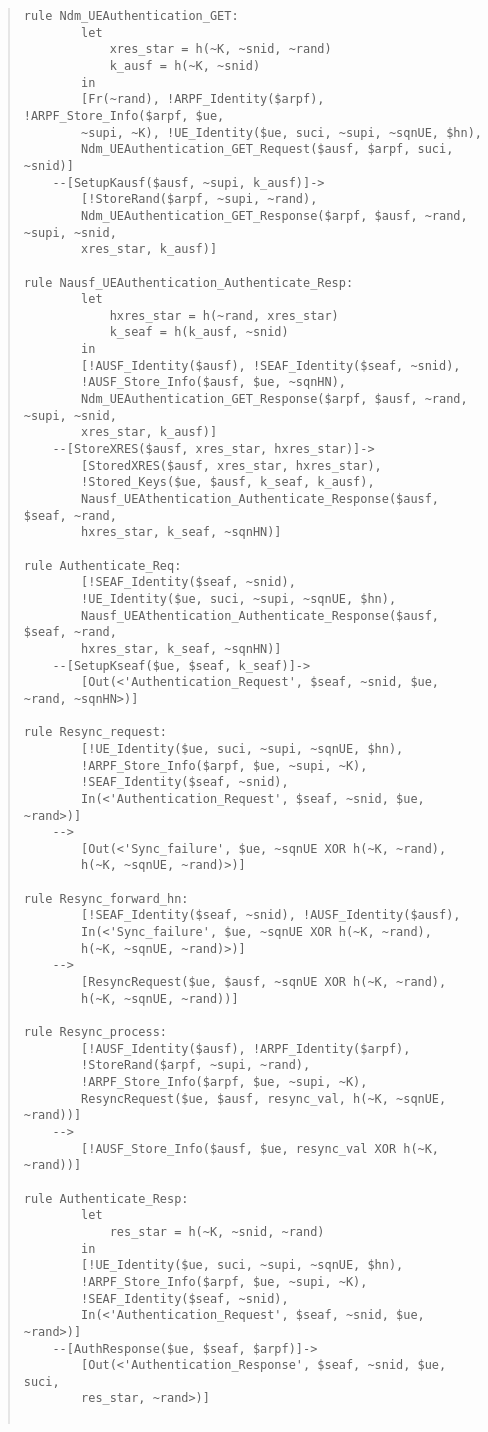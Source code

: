 \documentclass[10pt, pdftex]{article}
\begin{document}
\begin{quote}
\begin{verbatim}
rule Ndm_UEAuthentication_GET:
		let
			xres_star = h(~K, ~snid, ~rand)
			k_ausf = h(~K, ~snid)
		in
        [Fr(~rand), !ARPF_Identity($arpf), !ARPF_Store_Info($arpf, $ue,
        ~supi, ~K), !UE_Identity($ue, suci, ~supi, ~sqnUE, $hn),
        Ndm_UEAuthentication_GET_Request($ausf, $arpf, suci, ~snid)]
    --[SetupKausf($ausf, ~supi, k_ausf)]->
    	[!StoreRand($arpf, ~supi, ~rand),
    	Ndm_UEAuthentication_GET_Response($arpf, $ausf, ~rand, ~supi, ~snid,
    	xres_star, k_ausf)]

rule Nausf_UEAuthentication_Authenticate_Resp:
		let
			hxres_star = h(~rand, xres_star)
			k_seaf = h(k_ausf, ~snid)
		in
		[!AUSF_Identity($ausf), !SEAF_Identity($seaf, ~snid),
		!AUSF_Store_Info($ausf, $ue, ~sqnHN),
		Ndm_UEAuthentication_GET_Response($arpf, $ausf, ~rand, ~supi, ~snid,
		xres_star, k_ausf)]
	--[StoreXRES($ausf, xres_star, hxres_star)]->
		[StoredXRES($ausf, xres_star, hxres_star),
		!Stored_Keys($ue, $ausf, k_seaf, k_ausf),
		Nausf_UEAthentication_Authenticate_Response($ausf, $seaf, ~rand,
		hxres_star, k_seaf, ~sqnHN)]

rule Authenticate_Req:
		[!SEAF_Identity($seaf, ~snid),
		!UE_Identity($ue, suci, ~supi, ~sqnUE, $hn),
		Nausf_UEAthentication_Authenticate_Response($ausf, $seaf, ~rand,
		hxres_star, k_seaf, ~sqnHN)]
	--[SetupKseaf($ue, $seaf, k_seaf)]->
		[Out(<'Authentication_Request', $seaf, ~snid, $ue, ~rand, ~sqnHN>)]

rule Resync_request:
		[!UE_Identity($ue, suci, ~supi, ~sqnUE, $hn),
		!ARPF_Store_Info($arpf, $ue, ~supi, ~K),
		!SEAF_Identity($seaf, ~snid),
		In(<'Authentication_Request', $seaf, ~snid, $ue, ~rand>)]
	-->
		[Out(<'Sync_failure', $ue, ~sqnUE XOR h(~K, ~rand),
		h(~K, ~sqnUE, ~rand)>)]

rule Resync_forward_hn:
		[!SEAF_Identity($seaf, ~snid), !AUSF_Identity($ausf),
		In(<'Sync_failure', $ue, ~sqnUE XOR h(~K, ~rand),
		h(~K, ~sqnUE, ~rand)>)]
	-->
		[ResyncRequest($ue, $ausf, ~sqnUE XOR h(~K, ~rand),
		h(~K, ~sqnUE, ~rand))]

rule Resync_process:
		[!AUSF_Identity($ausf), !ARPF_Identity($arpf),
		!StoreRand($arpf, ~supi, ~rand),
		!ARPF_Store_Info($arpf, $ue, ~supi, ~K),
		ResyncRequest($ue, $ausf, resync_val, h(~K, ~sqnUE, ~rand))]
	-->
		[!AUSF_Store_Info($ausf, $ue, resync_val XOR h(~K, ~rand))]

rule Authenticate_Resp:
		let
			res_star = h(~K, ~snid, ~rand)
		in
		[!UE_Identity($ue, suci, ~supi, ~sqnUE, $hn),
		!ARPF_Store_Info($arpf, $ue, ~supi, ~K),
		!SEAF_Identity($seaf, ~snid),
		In(<'Authentication_Request', $seaf, ~snid, $ue, ~rand>)]
	--[AuthResponse($ue, $seaf, $arpf)]->
		[Out(<'Authentication_Response', $seaf, ~snid, $ue, suci,
		res_star, ~rand>)]


\end{verbatim}
\end{quote}
\end{document}
